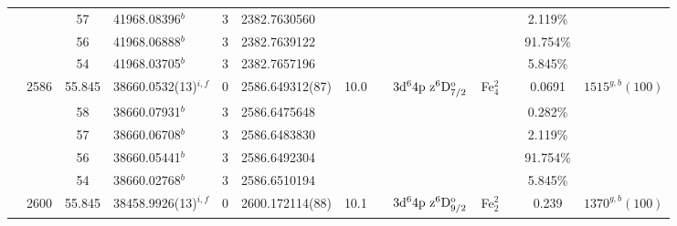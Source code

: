 \begin{table*}
\begin{center}
{\begin{tabular}{:l;l;c;l;c;l;c;l;l;c;c;c;c}
\rowstyle{\itshape}               &        & 57        & 41968.08396$^{b}$                & 3 &  2382.7630560      &      & $                                        $ & $                                        $ &             &              & 2.119\%   & $     ^{}     $\\
\rowstyle{\itshape}               &        & 56        & 41968.06888$^{b}$                & 3 &  2382.7639122      &      & $                                        $ & $                                        $ &             &              & 91.754\%  & $     ^{}     $\\
\rowstyle{\itshape}               &        & 54        & 41968.03705$^{b}$                & 3 &  2382.7657196      &      & $                                        $ & $                                        $ &             &              & 5.845\%   & $     ^{}     $\\
                                  & 2586   & 55.845    & 38660.0532(13)$^{i,f}$           & 0 &   2586.649312(87)  & 10.0 & $                                        $ & $3\rm{d}^64\rm{p~z}^6\rm{D}_{7/2}^{\rm o}$ & Fe$^2_{4}$  &              & 0.0691    & $ 1515^{g,b}(100)$\\
\rowstyle{\itshape}               &        & 58        & 38660.07931$^{b}$                & 3 &  2586.6475648      &      & $                                        $ & $                                        $ &             &              & 0.282\%   & $     ^{}     $\\
\rowstyle{\itshape}               &        & 57        & 38660.06708$^{b}$                & 3 &  2586.6483830      &      & $                                        $ & $                                        $ &             &              & 2.119\%   & $     ^{}     $\\
\rowstyle{\itshape}               &        & 56        & 38660.05441$^{b}$                & 3 &  2586.6492304      &      & $                                        $ & $                                        $ &             &              & 91.754\%  & $     ^{}     $\\
\rowstyle{\itshape}               &        & 54        & 38660.02768$^{b}$                & 3 &  2586.6510194      &      & $                                        $ & $                                        $ &             &              & 5.845\%   & $     ^{}     $\\
                                  & 2600   & 55.845    & 38458.9926(13)$^{i,f}$           & 0 &   2600.172114(88)  & 10.1 & $                                        $ & $3\rm{d}^64\rm{p~z}^6\rm{D}_{9/2}^{\rm o}$ & Fe$^2_{2}$  &              & 0.239     & $ 1370^{g,b}(100)$\\

\end{tabular}}
\end{center}
\end{table*}
